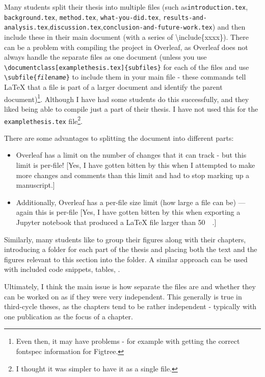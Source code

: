\documentclass[12pt, twoside]{article}
\newcommand{\fname}[1]{\texttt{#1}}
\begin{document}
Many students split their thesis into multiple files (such as\linebreak[4] \fname{introduction.tex}, \fname{background.tex}, \fname{method.tex}, \linebreak[4]\fname{what-you-did.tex}, \fname{results-and-analysis.tex},\fname{discussion.tex},\linebreak[4]  \fname{conclusion-and-future-work.tex}) and then include these in their main document (with a series of \textbackslash include\{xxxx\}). There can be a problem with compiling the project in Overleaf, as Overleaf does not always handle the separate files as one document (unless you use \texttt{\textbackslash documentclass[examplethesis.tex]\{subfiles\}} for each of the files and use \texttt{\textbackslash subfile\{\textit{filename}\}} to include them in your main file - these commands tell \LaTeX{}  that a file is part of a larger document and identify the parent document)\footnote{Even then, it may have problems - for example with getting the correct fontspec information for Figtree.}. Although I have had some students do this successfully, and they liked being able to compile just a part of their thesis. I have not used this for the \fname{examplethesis.tex} file\footnote{I thought it was simpler to have it as a single file.}.

There are some advantages to splitting the document into different parts:
\begin{itemize}
\item    Overleaf has a limit on the number of changes that it can track - but this limit is per-file!  [Yes, I have gotten bitten by this when I attempted to make more changes and comments than this limit and had to stop marking up a manuscript.]

\item    Additionally, Overleaf has a per-file size limit (\ie how large a file can be) --- again this is per-file [Yes, I have gotten bitten by this when exporting a Jupyter notebook that produced a \LaTeX{} file larger than \qty{50}{\mega\byte}.]
\end{itemize}

Similarly, many students like to group their figures along with their chapters, \ie introducing a folder for each part of the thesis and placing both the text and the figures relevant to this section into the folder. A similar approach can be used with included code snippets, tables, \etc.

Ultimately, I think the main issue is how separate the files are and whether they can be worked on as if they were very independent. This generally is true in third-cycle theses, as the chapters tend to be rather independent - typically with one publication as the focus of a chapter.
\end{document}
